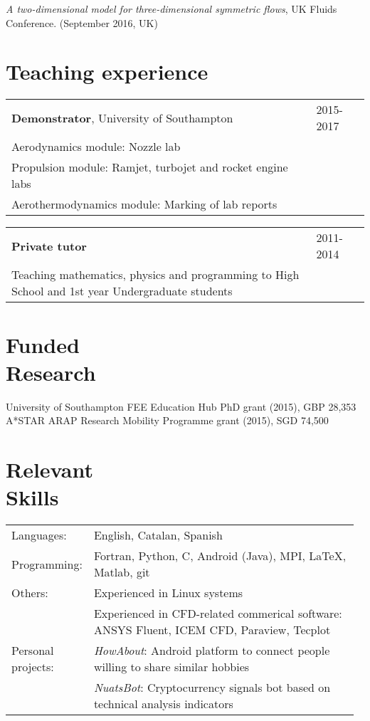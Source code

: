 \documentclass[margin,line,pifont,palatino,courier]{res}
\def\CC{{C\nolinebreak[4]\hspace{-.05em}\raisebox{.4ex}{\tiny\bf ++}}}
\begin{document}
\begin{resume}
\emph{A two-dimensional model for three-dimensional symmetric flows}, UK Fluids Conference. (September 2016, UK)

\section{\sc Teaching experience}
\begin{tabular}{@{}p{0.85\linewidth}p{0.15\linewidth}}
\textbf{Demonstrator}, University of Southampton & 2015-2017\\ 
\hspace*{1em}Aerodynamics module: Nozzle lab &\\
\hspace*{1em}Propulsion module: Ramjet, turbojet and rocket engine labs &\\
\hspace*{1em}Aerothermodynamics module: Marking of lab reports &
\end{tabular}

\begin{tabular}{@{}p{0.85\linewidth}p{0.15\linewidth}}
\textbf{Private tutor} & 2011-2014\\ 
\hspace*{1em}Teaching mathematics, physics and programming to High School and 1st year Undergraduate students&
\end{tabular}

\section{\sc Funded \\ Research}
University of Southampton FEE Education Hub PhD grant (2015), GBP 28,353\\
A*STAR ARAP Research Mobility Programme grant (2015), SGD 74,500

\section{\sc Relevant \\ Skills}
\begin{tabular}{@{}p{0.16\linewidth}p{0.81\linewidth}}
Languages:& English, Catalan, Spanish\\
Programming:& Fortran, Python, \CC, Android (Java), MPI, \LaTeX, Matlab, git\\
Others:& Experienced in Linux systems \\
& Experienced in CFD-related commerical software: ANSYS Fluent, ICEM CFD, Paraview,
Tecplot \\
Personal projects:& \textit{HowAbout}: Android platform to connect people willing to share similar hobbies\\
                  & \textit{NuatsBot}: Cryptocurrency signals bot based on technical analysis indicators\\
\end{tabular}


\end{resume}
\end{document}
